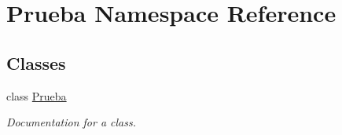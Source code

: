\hypertarget{namespace_prueba}{}\section{Prueba Namespace Reference}
\label{namespace_prueba}
\subsection*{Classes}
\begin{DoxyCompactItemize}
\item 
class \mbox{\hyperlink{class_prueba_1_1_prueba}{Prueba}}
\begin{DoxyCompactList}\small\item\em Documentation for a class. \end{DoxyCompactList}\end{DoxyCompactItemize}
